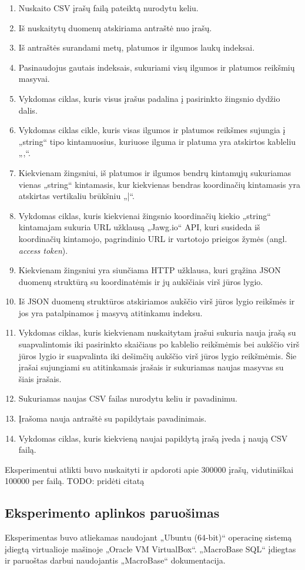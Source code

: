 \documentclass{VUMIFPSbakalaurinis}
\begin{document}
\begin{enumerate}
	\item Nuskaito CSV įrašų failą pateiktą nurodytu keliu.
	\item Iš nuskaitytų duomenų atskiriama antraštė nuo įrašų.
	\item Iš antraštės surandami metų, platumos ir ilgumos laukų indeksai.
	\item Pasinaudojus gautais indeksais, sukuriami visų ilgumos ir platumos reikšmių masyvai.
	\item Vykdomas ciklas, kuris visus įrašus padalina į pasirinkto žingsnio dydžio dalis.
	\item Vykdomas ciklas cikle, kuris visas ilgumos ir platumos reikšmes sujungia į „string“ tipo kintamuosius, kuriuose ilguma ir platuma yra atskirtos kableliu „,“.
	\item Kiekvienam žingsniui, iš platumos ir ilgumos bendrų kintamųjų sukuriamas vienas „string“ kintamasis, kur kiekvienas bendras koordinačių kintamasis yra atskirtas vertikaliu brūkšniu „|“.
	\item Vykdomas ciklas, kuris kiekvienai žingsnio koordinačių kiekio „string“ kintamajam sukuria URL užklausą „Jawg.io“ API, kuri susideda iš koordinačių kintamojo, pagrindinio URL ir vartotojo prieigos žymės (angl. \textit{access token}).
	\item Kiekvienam žingsniui yra siunčiama HTTP užklausa, kuri grąžina JSON duomenų struktūrą su koordinatėmis ir jų aukščiais virš jūros lygio.
	\item Iš JSON duomenų struktūros atskiriamos aukščio virš jūros lygio reikšmės ir jos yra patalpinamos į masyvą atitinkamu indeksu.
	\item Vykdomas ciklas, kuris kiekvienam nuskaitytam įrašui sukuria nauja įrašą su suapvalintomis iki pasirinkto skaičiaus po kablelio reikšmėmis bei aukščio virš jūros lygio ir suapvalinta iki dešimčių aukščio virš jūros lygio reikšmėmis. Šie įrašai sujungiami su atitinkamais įrašais ir sukuriamas naujas masyvas su šiais įrašais.
	\item Sukuriamas naujas CSV failas nurodytu keliu ir pavadinimu.
	\item Įrašoma nauja antraštė su papildytais pavadinimais.
	\item Vykdomas ciklas, kuris kiekvieną naujai papildytą įrašą įveda į naują CSV failą.
\end{enumerate}
Eksperimentui atlikti buvo nuskaityti ir apdoroti apie 300000 įrašų, vidutiniškai 100000 per failą.
TODO: pridėti citatą
\subsection{Eksperimento aplinkos paruošimas}
Eksperimentas buvo atliekamas naudojant „Ubuntu (64-bit)“ operacinę sistemą įdiegtą virtualioje mašinoje „Oracle VM VirtualBox“. „MacroBase SQL“ įdiegtas ir paruoštas darbui naudojantis „MacroBase“ dokumentacija.
\end{document}

